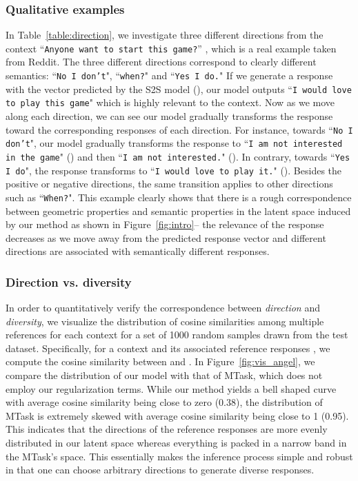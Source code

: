 \documentclass[11pt,a4paper]{article}
\begin{document}
\subsubsection{Qualitative examples} 
In Table~\ref{table:direction}, we investigate three different directions from the context ``\texttt{Anyone want to start this game?}''
, which is a real example taken from Reddit.
The three different directions correspond to clearly different semantics: ``\texttt{No I don't}", ``\texttt{when?}" and ``\texttt{Yes I do.}" If we generate a response with the vector predicted by the S2S model (), our model outputs ``\texttt{I would love to play this game}" which is highly relevant to the context. Now as we move along each direction, we can see our model gradually transforms the response toward the corresponding responses of each direction. For instance, towards ``\texttt{No I don't}", our model gradually transforms the response to ``\texttt{I am not interested in the game}" () and then ``\texttt{I am not interested.}" (). In contrary, towards ``\texttt{Yes I do}", the response transforms to ``\texttt{I would love to play it.}" (). Besides the positive or negative directions, the same transition applies to other directions such as ``\texttt{When?}". This example clearly shows that there is a rough correspondence between geometric properties and semantic properties in the latent space induced by our method as shown in Figure~\ref{fig:intro}-- the relevance of the response decreases as we move away from the predicted response vector and different directions are associated with semantically
different responses. 




\subsubsection{Direction vs. diversity} 
In order to quantitatively verify the correspondence between \textit{direction} and \textit{diversity}, we visualize the distribution of cosine similarities among multiple references for each context for a set of 1000 random samples drawn from the test dataset. Specifically, for a context  and its associated reference responses , we compute the cosine similarity between  and .
In Figure~\ref{fig:vis_angel}, we compare the distribution of our model with that of MTask, which does not employ our regularization terms.
While our method yields a bell shaped curve with average cosine similarity being close to zero (0.38), the distribution of MTask is extremely skewed with average cosine similarity being close to 1 (0.95). This indicates that the directions of the reference responses are more evenly distributed in our latent space whereas everything is packed in a narrow band in the MTask's space. This essentially makes the inference process simple and robust in that one can choose arbitrary directions to generate diverse responses.
\end{document}
